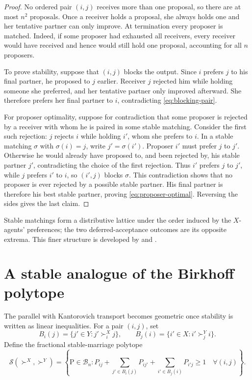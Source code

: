 \documentclass[11pt]{article}
\theoremstyle{definition}
\theoremstyle{remark}
\newcommand{\Pmat}{\mathrm P}
\newcommand{\Bcal}{\mathcal B}
\newcommand{\Scal}{\mathcal S}
\begin{document}
\begin{proof}
No ordered pair \((i,j)\) receives more than one proposal, so there are at most
\(n^2\) proposals. Once a receiver holds a proposal, she always holds one and
her tentative partner can only improve. At termination every proposer is
matched. Indeed, if some proposer had exhausted all receivers, every receiver
would have received and hence would still hold one proposal, accounting for
all \(n\) proposers.

To prove stability, suppose that \((i,j)\) blocks the output. Since \(i\)
prefers \(j\) to his final partner, he proposed to \(j\) earlier. Receiver
\(j\) rejected him while holding someone she preferred, and her tentative
partner only improved afterward. She therefore prefers her final partner to
\(i\), contradicting \eqref{eq:blocking-pair}.

For proposer optimality, suppose for contradiction that some proposer is
rejected by a receiver with whom he is paired in some stable matching. Consider
the first such rejection: \(j\) rejects \(i\) while holding \(i'\), whom she
prefers to \(i\). In a stable matching \(\sigma\) with \(\sigma(i)=j\), write
\(j'=\sigma(i')\). Proposer \(i'\) must prefer \(j\) to \(j'\). Otherwise he
would already have proposed to, and been rejected by, his stable partner
\(j'\), contradicting the choice of the first rejection. Thus \(i'\) prefers
\(j\) to \(j'\), while \(j\) prefers \(i'\) to \(i\), so \((i',j)\) blocks
\(\sigma\). This contradiction shows that no proposer is ever rejected by a
possible stable partner. His final partner is therefore his best stable
partner, proving \eqref{eq:proposer-optimal}. Reversing the sides gives the
last claim.
\end{proof}

Stable matchings form a distributive lattice under the order induced by the
\(X\)-agents' preferences; the two deferred-acceptance outcomes are its
opposite extrema. This finer structure is developed by
\citet{GusfieldIrving1989} and \citet{RothSotomayor1990}.

\section{A stable analogue of the Birkhoff polytope}
\label{sec:stable-polytope}

The parallel with Kantorovich transport becomes geometric once stability is
written as linear inequalities. For a pair \((i,j)\), set
\begin{equation}\label{eq:better-sets}
  B_i(j)=\{j'\in Y:j'\succ_i^X j\},
  \qquad
  B_j(i)=\{i'\in X:i'\succ_j^Y i\}.
\end{equation}
Define the fractional stable-marriage polytope
\begin{equation}\label{eq:stable-polytope}
  \Scal(\succ^X,\succ^Y)
  =\left\{\Pmat\in\Bcal_n:
  P_{ij}+\sum_{j'\in B_i(j)}P_{ij'}
  +\sum_{i'\in B_j(i)}P_{i'j}\geq1
  \quad\forall(i,j)\right\}.
\end{equation}
\end{document}
